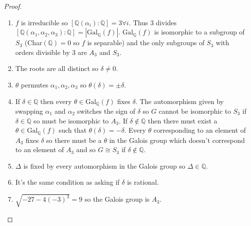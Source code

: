 \documentclass{article}
\begin{document}
\begin{proof}
\begin{enumerate}[label=(\roman*)]
    \item $f$ is irreducible so $[\mathbb{Q}(\alpha_i):\mathbb{Q}]=3\forall i$. Thus $3$ divides $[\mathbb{Q}(\alpha_1,\alpha_2,\alpha_3):\mathbb{Q}]=|\text{Gal}_\mathbb{Q}(f)|$. $\text{Gal}_\mathbb{Q}(f)$ is isomorphic to a subgroup of $S_3$ (Char$(\mathbb{Q})=0$ so $f$ is separable) and the only subgroups of $S_3$ with orders divisible by $3$ are $A_3$ and $S_3$.
    \item The roots are all distinct so $\delta\neq0$.
    \item $\theta$ permutes $\alpha_1,\alpha_2,\alpha_3$ so $\theta(\delta)=\pm\delta$.
    \item If $\delta\in\mathbb{Q}$ then every $\theta\in\text{Gal}_\mathbb{Q}(f)$ fixes $\delta$. The automorphism given by swapping $\alpha_1$ and $\alpha_2$ switches the sign of $\delta$ so $G$ cannot be isomorphic to $S_3$ if $\delta\in\mathbb{Q}$ so must be isomorphic to $A_3$. If $\delta\not\in\mathbb{Q}$ then there must exist a $\theta\in\text{Gal}_\mathbb{Q}(f)$ such that $\theta(\delta)=-\delta$. Every $\theta$ corresponding to an element of $A_3$ fixes $\delta$ so there must be a $\theta$ in the Galois group which doesn't correspond to an element of $A_3$ and so $G\cong S_3$ if $\delta\not\in\mathbb{Q}$.
    \item $\Delta$ is fixed by every automorphism in the Galois group so $\Delta\in\mathbb{Q}$.
    \item It's the same condition as asking if $\delta$ is rational.
    \item $\sqrt{-27-4(-3)^3}=9$ so the Galois group is $A_3$.
\end{enumerate}
\end{proof}
\end{document}
